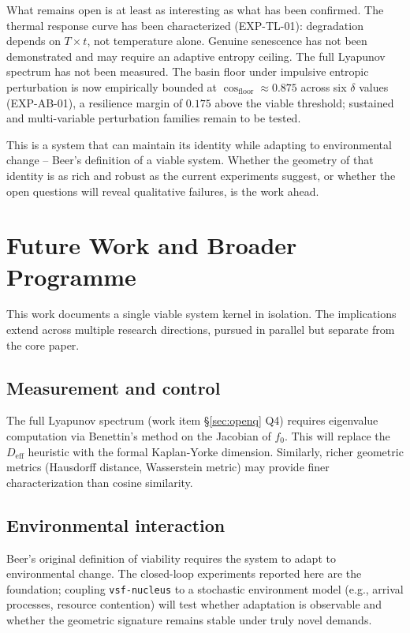 \documentclass[11pt, a4paper]{article}
\newcommand{\nucleus}{\texttt{vsf-nucleus}}
\begin{document}
What remains open is at least as interesting as what has been confirmed.
The thermal response curve has been characterized (EXP-TL-01): degradation
depends on $T \times t$, not temperature alone.
Genuine senescence has not been demonstrated and may require an
adaptive entropy ceiling.
The full Lyapunov spectrum has not been measured.
The basin floor under impulsive entropic perturbation is now empirically
bounded at $\cos_\text{floor} \approx 0.875$ across six $\delta$ values
(EXP-AB-01), a resilience margin of $0.175$ above the viable threshold;
sustained and multi-variable perturbation families remain to be tested.

This is a system that can maintain its identity while adapting to
environmental change -- Beer's definition of a viable system.
Whether the geometry of that identity is as rich and robust as the
current experiments suggest, or whether the open questions will reveal
qualitative failures, is the work ahead.


\section{Future Work and Broader Programme}
\label{sec:future}

This work documents a single viable system kernel in isolation.
The implications extend across multiple research directions, pursued
in parallel but separate from the core paper.

\subsection*{Measurement and control}

The full Lyapunov spectrum (work item §\ref{sec:openq} Q4) requires
eigenvalue computation via Benettin's method on the Jacobian of $f_0$.
This will replace the $D_\text{eff}$ heuristic with the formal Kaplan-Yorke
dimension.
Similarly, richer geometric metrics (Hausdorff distance, Wasserstein metric)
may provide finer characterization than cosine similarity.

\subsection*{Environmental interaction}

Beer's original definition of viability requires the system to adapt
to environmental change. The closed-loop experiments reported here
are the foundation; coupling \nucleus{} to a stochastic environment
model (e.g., arrival processes, resource contention) will test
whether adaptation is observable and whether the geometric signature
remains stable under truly novel demands.
\end{document}
